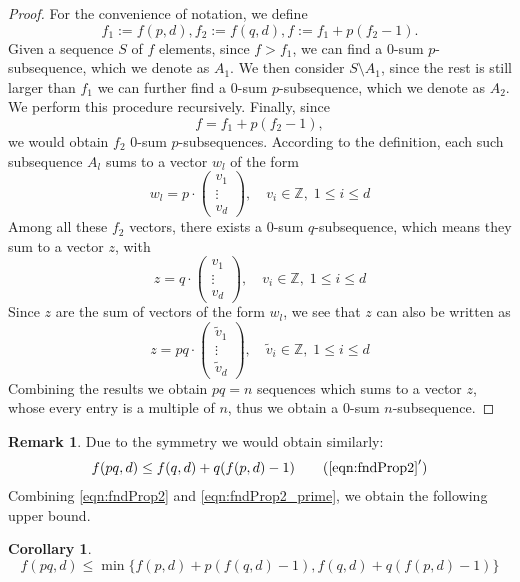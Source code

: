 \documentclass{article}
\theoremstyle{definition}
\newtheorem{corollary}[theorem]{Corollary}
\newtheorem{remark}[theorem]{Remark}
\numberwithin{equation}{theorem}
\numberwithin{figure}{theorem}
\newcommand{\Integer}{\ensuremath{\mathbb{Z}}}
\newcommand{\zeroSumSeq}[1]{$0$-sum $#1$-subsequence}
\newcommand{\fnd}[2]{\ensuremath{f(#1,#2)}}
\begin{document}
    \begin{proof}
        For the convenience of notation, we define 
        \[f_1 := \fnd{p}{d}, f_2 := \fnd{q}{d}, f := f_1 + p(f_2 - 1).\]
        Given a sequence $S$ of $f$ elements, 
        since $f > f_1$, we can find a \zeroSumSeq{p}, 
        which we denote as $A_1$.
        We then consider $S \setminus A_1$, since 
        the rest is still larger than $f_1$ we can 
        further find a \zeroSumSeq{p}, which we denote 
        as $A_2$.
        We perform this procedure recursively. Finally, 
        since 
        \[f = f_1 + p (f_2 - 1),\]
        we would obtain $f_2$ \zeroSumSeq{p}s. According to the definition, each such subsequence $A_l$ sums to a vector $w_l$ of the form
        \begin{equation*}\label{eqn:fnd_pq_p_sumVec}
            w_l = p \cdot \begin{pmatrix}
            v_1\\
            \vdots\\
            v_d
        \end{pmatrix}, \quad v_i \in \Integer, \; 1 \leq i \leq d
        \end{equation*}
        Among all these $f_2$ vectors, there exists a \zeroSumSeq{q}, which means 
        they sum to a vector $z$, with
        \[z = q \cdot \begin{pmatrix}
            v_1\\
            \vdots\\
            v_d
        \end{pmatrix}, \quad v_i \in \Integer, \; 1 \leq i \leq d\]
        Since $z$ are the sum of vectors of the form $w_l$, we see that $z$ can also be written as
        \[
            z = pq \cdot \begin{pmatrix}
                \tilde{v}_1\\
                \vdots\\
                \tilde{v}_d
            \end{pmatrix}, \quad \tilde{v}_i \in \Integer, \; 1 \leq i \leq d\]
        Combining the results we obtain $pq = n$ sequences which sums to a vector $z$, whose every 
        entry is a multiple of $n$, thus we obtain a \zeroSumSeq{n}.
    \end{proof}
    \begin{remark}
        Due to the symmetry we would obtain similarly:
        \begin{align}\label{eqn:fndProp2_prime}
            \fnd{pq}{d} \leq \fnd{q}{d} + q(\fnd{p}{d} - 1)\tag{$\ref{eqn:fndProp2}^\prime$}
        \end{align}
        Combining \eqref{eqn:fndProp2} and \eqref{eqn:fndProp2_prime}, we obtain the following upper bound.
    \end{remark}
    \begin{corollary}\label{cor:fnd_pq_Bound}
        \begin{equation}\label{eqn:fnd_pq_Bound}
            \fnd{pq}{d} \leq \min \{\fnd{p}{d} + p(\fnd{q}{d} - 1),  \fnd{q}{d} + q(\fnd{p}{d} - 1)\}
        \end{equation}
    \end{corollary}
    
\end{document}
